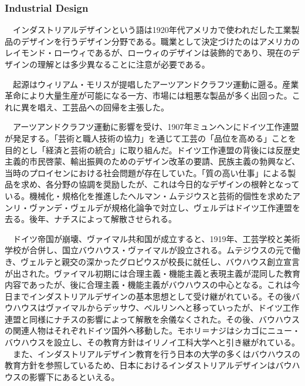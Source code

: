 \subsubsection{Industrial Design}
　インダストリアルデザインという語は1920年代アメリカで使われだした工業製品のデザインを行うデザイン分野である。職業として決定づけたのはアメリカのレイモンド・ローウィであるが、ローウィのデザインは装飾的であり、現在のデザインの理解とは多少異なることに注意が必要である。

　起源はウィリアム・モリスが提唱したアーツアンドクラフツ運動に遡る。産業革命により大量生産が可能になる一方、市場には粗悪な製品が多く出回った。これに異を唱え、工芸品への回帰を主張した。

　アーツアンドクラフツ運動に影響を受け、1907年ミュンヘンにドイツ工作連盟が発足する。「芸術と職人技術の協力」を通じて工芸の「品位を高める」ことを目的とし「経済と芸術の統合」に取り組んだ。ドイツ工作連盟の背後には反歴史主義的市民啓蒙、輸出振興のためのデザイン改革の要請、民族主義の勃興など、当時のプロイセンにおける社会問題が存在していた。「質の高い仕事」による製品を求め、各分野の協調を奨励したが、これは今日的なデザインの根幹となっている。機械化・規格化を推進したヘルマン・ムテジウスと芸術的個性を求めたアンリ・ヴァンデ・ヴェルデが規格化論争で対立し、ヴェルデはドイツ工作連盟を去る。後年、ナチスによって解散させられる。

　ドイツ帝国が崩壊、ヴァイマル共和国が成立すると、1919年、工芸学校と美術学校が合併し、国立バウハウス・ヴァイマルが設立される。ムテジウスの元で働き、ヴェルテと親交の深かったグロピウスが校長に就任し、バウハウス創立宣言が出された。ヴァイマル初期には合理主義・機能主義と表現主義が混同した教育内容であったが、後に合理主義・機能主義がバウハウスの中心となる。これは今日までインダストリアルデザインの基本思想として受け継がれている。その後バウハウスはヴァイマルからデッサウ、ベルリンへと移っていったが、ドイツ工作連盟と同様にナチスの影響によって解散を余儀なくされた。その後、バウハウスの関連人物はそれぞれドイツ国外へ移動した。モホリ＝ナジはシカゴにニュー・バウハウスを設立し、その教育方針はイリノイ工科大学へと引き継がれている。
　また、インダストリアルデザイン教育を行う日本の大学の多くはバウハウスの教育方針を参照しているため、日本におけるインダストリアルデザインはバウハウスの影響下にあるといえる。

